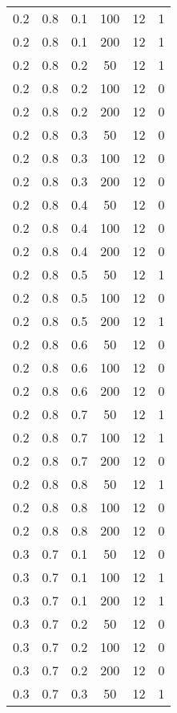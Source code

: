 \begin{center}
\begin{longtable}[c]{|c|c|c|c|c|c|}
	0.2 &  0.8 &  0.1 &  100 &    12 &     1 \\
	0.2 &  0.8 &  0.1 &  200 &    12 &     1 \\
   \hline
	0.2 &  0.8 &  0.2 &   50 &    12 &     1 \\
	0.2 &  0.8 &  0.2 &  100 &    12 &     0 \\
	0.2 &  0.8 &  0.2 &  200 &    12 &     0 \\
   \hline
	0.2 &  0.8 &  0.3 &   50 &    12 &     0 \\
	0.2 &  0.8 &  0.3 &  100 &    12 &     0 \\
	0.2 &  0.8 &  0.3 &  200 &    12 &     0 \\
   \hline
	0.2 &  0.8 &  0.4 &   50 &    12 &     0 \\
	0.2 &  0.8 &  0.4 &  100 &    12 &     0 \\
	0.2 &  0.8 &  0.4 &  200 &    12 &     0 \\
   \hline
	0.2 &  0.8 &  0.5 &   50 &    12 &     1 \\
	0.2 &  0.8 &  0.5 &  100 &    12 &     0 \\
	0.2 &  0.8 &  0.5 &  200 &    12 &     1 \\
   \hline
	0.2 &  0.8 &  0.6 &   50 &    12 &     0 \\
	0.2 &  0.8 &  0.6 &  100 &    12 &     0 \\
	0.2 &  0.8 &  0.6 &  200 &    12 &     0 \\
   \hline
	0.2 &  0.8 &  0.7 &   50 &    12 &     1 \\
	0.2 &  0.8 &  0.7 &  100 &    12 &     1 \\
	0.2 &  0.8 &  0.7 &  200 &    12 &     0 \\
   \hline
	0.2 &  0.8 &  0.8 &   50 &    12 &     1 \\
	0.2 &  0.8 &  0.8 &  100 &    12 &     0 \\
	0.2 &  0.8 &  0.8 &  200 &    12 &     0 \\
   \hline
	0.3 &  0.7 &  0.1 &   50 &    12 &     0 \\
	0.3 &  0.7 &  0.1 &  100 &    12 &     1 \\
	0.3 &  0.7 &  0.1 &  200 &    12 &     1 \\
   \hline
	0.3 &  0.7 &  0.2 &   50 &    12 &     0 \\
	0.3 &  0.7 &  0.2 &  100 &    12 &     0 \\
	0.3 &  0.7 &  0.2 &  200 &    12 &     0 \\
   \hline
	0.3 &  0.7 &  0.3 &   50 &    12 &     1 \\

\end{longtable}
\end{center}

